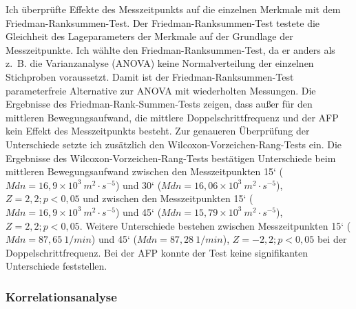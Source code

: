 Ich überprüfte Effekte des Messzeitpunkts auf die einzelnen Merkmale mit dem Friedman-Ranksummen-Test. Der Friedman-Ranksummen-Test testete die Gleichheit des Lageparameters der Merkmale auf der Grundlage der Messzeitpunkte. Ich wählte den Friedman-Ranksummen-Test, da er anders als z.~B. die Varianzanalyse (ANOVA) keine Normalverteilung der einzelnen Stichproben voraussetzt. Damit ist der Friedman-Ranksummen-Test parameterfreie Alternative zur ANOVA mit wiederholten Messungen. Die Ergebnisse des Friedman-Rank-Summen-Tests zeigen, dass außer für den mittleren Bewegungsaufwand, die mittlere Doppelschrittfrequenz und der \ac{AFP} kein Effekt des Messzeitpunkts besteht. Zur genaueren Überprüfung der Unterschiede setzte ich zusätzlich den Wilcoxon-Vorzeichen-Rang-Tests ein. Die Ergebnisse des Wilcoxon-Vorzeichen-Rang-Tests bestätigen Unterschiede beim mittleren Bewegungsaufwand zwischen den Messzeitpunkten 15‘ ($Mdn = 16{,}9 \times 10^3 \: m^2 \cdot s^{-5}$) und 30‘ ($Mdn = 16{,}06 \times 10^3 \: m^2 \cdot s^{-5}$), $Z = 2{,}2; p < 0{,}05$ und zwischen den Messzeitpunkten 15‘ ($Mdn = 16{,}9 \times 10^3 \: m^2 \cdot s^{-5}$) und 45‘ ($Mdn = 15{,}79 \times 10^3 \: m^2 \cdot s^{-5}$), $Z = 2{,}2; p < 0{,}05$. Weitere Unterschiede bestehen zwischen Messzeitpunkten 15‘ ($Mdn = 87{,}65 \: 1/min$) und 45‘ ($Mdn = 87{,}28 \: 1/min$), $Z = -2{,}2; p < 0{,}05$ bei der Doppelschrittfrequenz. Bei der \ac{AFP} konnte der Test keine signifikanten Unterschiede feststellen. 

\subsubsection{Korrelationsanalyse} 

\label{subs:korrelationsanalyse}

